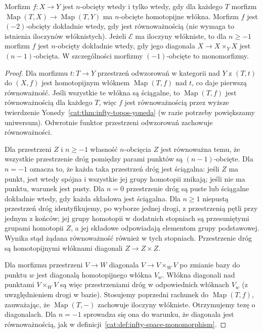 \begin{stwierdzenie}\label{cat:prop:infty-topos-truncation-diagonal}
Morfizm $f:X\to Y$ jest $n$-obcięty wtedy i tylko wtedy, gdy dla każdego $T$ morfizm $\operatorname{Map}(T,X)\to\operatorname{Map}(T,Y)$ ma $n$-obcięte homotopijne włókna. Morfizm $f$ jest $(-2)$-obcięty dokładnie wtedy, gdy jest równoważnością (nie wymaga to istnienia iloczynów włóknistych). Jeżeli $\mathcal E$ ma iloczyny włókniste, to dla $n\geq-1$ morfizm $f$ jest $n$-obcięty dokładnie wtedy, gdy jego diagonala $X\to X\times_Y X$ jest $(n-1)$-obcięta.
W szczególności morfizmy $(-1)$-obcięte to monomorfizmy.
\end{stwierdzenie}
\begin{proof}
Dla morfizmu $t:T\to Y$ przestrzeń odwzorowań w kategorii nad $Y$ z $(T,t)$ do $(X,f)$ jest homotopijnym włóknem $\operatorname{Map}(T,f)$ nad $t$, co daje pierwszą równoważność. Jeśli wszystkie te włókna są ściągalne, to $\operatorname{Map}(T,f)$ jest równoważnością dla każdego $T$, więc $f$ jest równoważnością przez wyższe twierdzenie Yonedy~\ref{cat:thm:infty-topos-yoneda} (w razie potrzeby powiększamy uniwersum). Odwrotnie funktor przestrzeni odwzorowań zachowuje równoważności.

Dla przestrzeni $Z$ i $n\geq-1$ własność $n$-obcięcia $Z$ jest równoważna temu, że wszystkie przestrzenie dróg pomiędzy parami punktów są $(n-1)$-obcięte. Dla $n=-1$ oznacza to, że każda taka przestrzeń dróg jest ściągalna: jeśli $Z$ ma punkt, jest wtedy spójna i wszystkie jej grupy homotopii znikają; jeśli nie ma punktu, warunek jest pusty. Dla $n=0$ przestrzenie dróg są puste lub ściągalne dokładnie wtedy, gdy każda składowa jest ściągalna. Dla $n\geq1$ niepustą przestrzeń dróg identyfikujemy, po wyborze jednej drogi, z przestrzenią pętli przy jednym z końców; jej grupy homotopii w dodatnich stopniach są przesuniętymi grupami homotopii $Z$, a jej składowe odpowiadają elementom grupy podstawowej. Wynika stąd żądana równoważność również w tych stopniach. Przestrzenie dróg są homotopijnymi włóknami diagonali $Z\to Z\times Z$.

Dla morfizmu przestrzeni $V\to W$ diagonala $V\to V\times_W V$ po zmianie bazy do punktu $w$ jest diagonalą homotopijnego włókna $V_w$. Włókna diagonali nad punktami $V\times_WV$ są więc przestrzeniami dróg w odpowiednich włóknach $V_w$ (z uwzględnieniem drogi w bazie). Stosujemy poprzedni rachunek do $\operatorname{Map}(T,f)$, zauważając, że $\operatorname{Map}(T,-)$ zachowuje iloczyny włókniste. Otrzymujemy tezę o diagonalach. Dla $n=-1$ sprowadza się ona do warunku, że diagonala jest równoważnością, jak w definicji~\ref{cat:def:infty-space-monomorphism}.
\end{proof}

